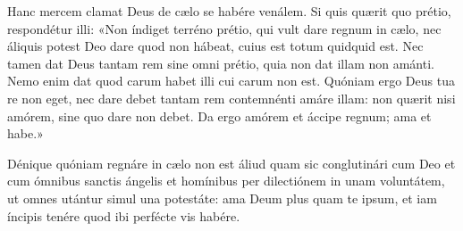 {

\noindent Hanc mercem clamat Deus de cælo se habére venálem. Si quis quærit quo prétio, respondétur illi: «Non índiget terréno prétio, qui vult dare regnum in cælo, nec áliquis potest Deo dare quod non hábeat, cuius est totum quidquid est. Nec tamen dat Deus tantam rem sine omni prétio, quia non dat illam non amánti. Nemo enim dat quod carum habet illi cui carum non est. Quóniam ergo Deus tua re non eget, nec dare debet tantam rem contemnénti amáre illam: non quærit nisi amórem, sine quo dare non debet. Da ergo amórem et áccipe regnum; ama et habe.»

\noindent Dénique quóniam regnáre in cælo non est áliud quam sic conglutinári cum Deo et cum ómnibus sanctis ángelis et homínibus per dilectiónem in unam voluntátem, ut omnes utántur simul una potestáte: ama Deum plus quam te ipsum, et iam íncipis tenére quod ibi perfécte vis habére.


\vfill
\pagebreak

 

\vspace{-5mm}


\vfill
\pagebreak
}
\newcommand{\responsoriumbreve}{\pars{Responsorium breve.}

\cuminitiali{VI}{temporalia/resp-christefilidei.gtex}}
\newcommand{\benedictus}{\pars{Canticum Zachariæ.} \scriptura{Mt. 16, 13.16.18}

\vspace{-5mm}

\antiphona{VIII G}{temporalia/ant-quemdicunthominesesse.gtex}


\vspace{-1mm}

\scriptura{Lc. 1, 68-79}

\vspace{-4mm}

\cantusSineNeumas
\initiumpsalmi{temporalia/benedictus-initium-viiisoll-G-auto.gtex}

\vspace{-1.5mm}



\antiphona{VIII G}{temporalia/ant-quemdicunthominesesse.gtex}

\vspace{-10mm}}



